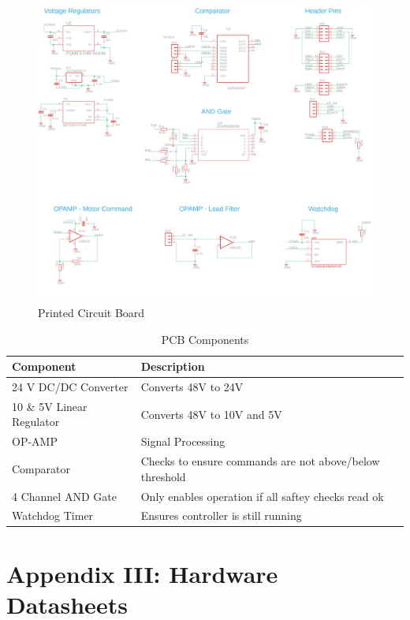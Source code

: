 \documentclass[12pt]{report}
\begin{document}
		
	\begin{figure}[t] 
		\centering
		\includegraphics[width=\linewidth]{pcb_schematic}
		\caption{Printed Circuit Board}
		\label{fig:pcb}
	\end{figure}

	\begin{table}[]
	\centering
	\caption{PCB Components}	
	\begin{tabular}{|l|l|}
		\hline
		\textbf{Component} & \textbf{Description}  \\ \hline
		24 V DC/DC Converter & Converts 48V to 24V  \\ \hline
		10 \& 5V Linear Regulator & Converts 48V to 10V and 5V  \\ \hline
		OP-AMP & Signal Processing   \\ \hline
		Comparator & Checks to ensure commands are not above/below threshold   \\ \hline
		4 Channel AND Gate & Only enables operation if all saftey checks read ok   \\ \hline
		Watchdog Timer & Ensures controller is still running \\ \hline

		\end{tabular}
	\label{tab:belt}
	\end{table}

\chapter*{Appendix III: Hardware Datasheets}
\end{document}
